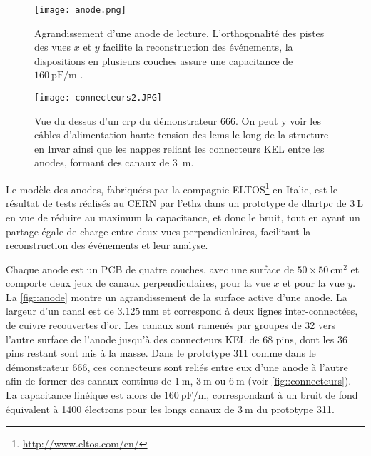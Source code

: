            \begin{figure}[htbp]
                \begin{center}\texttt{[image: anode.png]}\end{center}
                \caption[Agrandissement d'une anode de lecture.]{Agrandissement d'une anode de lecture. L'orthogonalité des pistes des vues $x$ et $y$ facilite la reconstruction des événements, la dispositions en plusieurs couches assure une capacitance de $\SI{160}{\pico\farad\per\meter}$ \cite{Cantini2013}.}
                \label{fig::anode}
            \end{figure}
            \begin{figure}[htbp]
                \begin{center}\texttt{[image: connecteurs2.JPG]}\end{center}
                \caption[Vue du dessus d'un \gls{crp} du démonstrateur 666.]{Vue du dessus d'un \gls{crp} du démonstrateur 666. On peut y voir les câbles d'alimentation haute tension des \glspl{lem} le long de la structure en Invar ainsi que les nappes reliant les connecteurs KEL entre les anodes, formant des canaux de \SI{3}{\meter}.}
                \label{fig::connecteurs}
            \end{figure}
            
            Le modèle des anodes, fabriquées par la compagnie ELTOS\footnote{\url{http://www.eltos.com/en/}} en Italie, est le résultat de tests réalisés au CERN par l'\gls{ethz} dans un prototype de \gls{dlartpc} de $\SI{3}{\liter}$ \cite{Cantini2013} en vue de réduire au maximum la capacitance, et donc le bruit, tout en ayant un partage égale de charge entre deux vues perpendiculaires, facilitant la reconstruction des événements et leur analyse.
            
            Chaque anode est un PCB de quatre couches, avec une surface de  $50\times\SI{50}{\centi\meter\squared}$ et comporte deux jeux de canaux perpendiculaires,  pour la vue $x$ et  pour la vue $y$. La \autoref{fig::anode} montre un agrandissement de la surface active d'une anode. La largeur d'un canal est de $\SI{3.125}{\milli\meter}$ et correspond à deux lignes inter-connectées, de cuivre recouvertes d'or. Les canaux sont ramenés par groupes de 32 vers l'autre surface de l'anode jusqu'à des connecteurs KEL de 68 pins, dont les 36 pins restant sont mis à la masse. Dans le prototype 311 comme dans le démonstrateur 666, ces connecteurs sont reliés entre eux d'une anode à l'autre afin de former des canaux continus de $\SI{1}{\meter}$, $\SI{3}{\meter}$ ou $\SI{6}{\meter}$ (voir  \autoref{fig::connecteurs}). La capacitance linéique est alors de $\SI{160}{\pico\farad\per\meter}$, correspondant à un bruit de fond équivalent à 1400 électrons \cite{Aimard2018} pour les longs canaux de $\SI{3}{\meter}$ du prototype 311.
            
